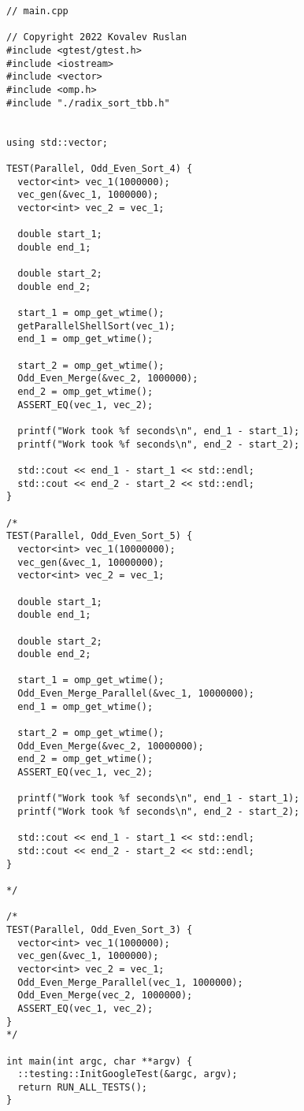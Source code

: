 \documentclass{report}
\begin{document}
\begin{lstlisting}
// main.cpp

// Copyright 2022 Kovalev Ruslan
#include <gtest/gtest.h>
#include <iostream>
#include <vector>
#include <omp.h>
#include "./radix_sort_tbb.h"


using std::vector;

TEST(Parallel, Odd_Even_Sort_4) {
  vector<int> vec_1(1000000);
  vec_gen(&vec_1, 1000000);
  vector<int> vec_2 = vec_1;

  double start_1;
  double end_1;

  double start_2;
  double end_2;

  start_1 = omp_get_wtime();
  getParallelShellSort(vec_1);
  end_1 = omp_get_wtime();

  start_2 = omp_get_wtime();
  Odd_Even_Merge(&vec_2, 1000000);
  end_2 = omp_get_wtime();
  ASSERT_EQ(vec_1, vec_2);

  printf("Work took %f seconds\n", end_1 - start_1);
  printf("Work took %f seconds\n", end_2 - start_2);

  std::cout << end_1 - start_1 << std::endl;
  std::cout << end_2 - start_2 << std::endl;
}

/*
TEST(Parallel, Odd_Even_Sort_5) {
  vector<int> vec_1(10000000);
  vec_gen(&vec_1, 10000000);
  vector<int> vec_2 = vec_1;

  double start_1;
  double end_1;

  double start_2;
  double end_2;

  start_1 = omp_get_wtime();
  Odd_Even_Merge_Parallel(&vec_1, 10000000);
  end_1 = omp_get_wtime();

  start_2 = omp_get_wtime();
  Odd_Even_Merge(&vec_2, 10000000);
  end_2 = omp_get_wtime();
  ASSERT_EQ(vec_1, vec_2);

  printf("Work took %f seconds\n", end_1 - start_1);
  printf("Work took %f seconds\n", end_2 - start_2);

  std::cout << end_1 - start_1 << std::endl;
  std::cout << end_2 - start_2 << std::endl;
}

*/

/*
TEST(Parallel, Odd_Even_Sort_3) {
  vector<int> vec_1(1000000);
  vec_gen(&vec_1, 1000000);
  vector<int> vec_2 = vec_1;
  Odd_Even_Merge_Parallel(vec_1, 1000000);
  Odd_Even_Merge(vec_2, 1000000);
  ASSERT_EQ(vec_1, vec_2);
}
*/

int main(int argc, char **argv) {
  ::testing::InitGoogleTest(&argc, argv);
  return RUN_ALL_TESTS();
}
\end{lstlisting}
\end{document}
